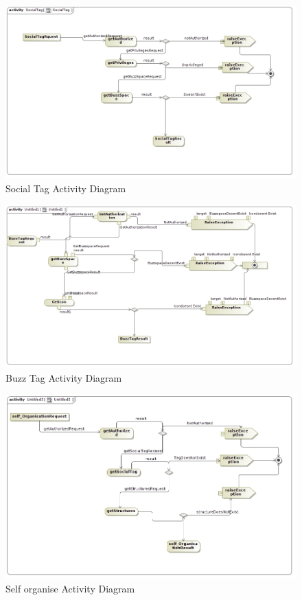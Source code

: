 \documentclass[11pt]{article}
\begin{document}
	\begin{figure}[H]	
\graphicspath{ {../Diagrams/sfiso/} }
    	\includegraphics[scale=0.5]{socialA.jpg}
    	\caption{Social Tag  Activity Diagram}
	\end{figure}
	\begin{figure}[H]	
\graphicspath{ {../Diagrams/sfiso/} }
    	\includegraphics[scale=0.5]{buzzA.jpg}
    	\caption{Buzz Tag  Activity Diagram}
	\end{figure}

	\begin{figure}[H]	
\graphicspath{ {../Diagrams/sfiso/} }
    	\includegraphics[scale=0.5]{selfA.jpg}
    	\caption{Self organise Activity Diagram}
	\end{figure}
\end{document}

